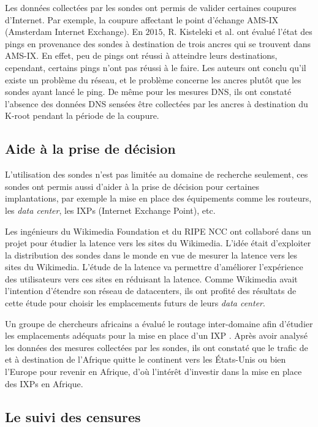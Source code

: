 Les données collectées par les sondes  ont permis de valider certaines coupures d'Internet. Par exemple, la coupure affectant le point d'échange AMS-IX (Amsterdam Internet Exchange). En $2015$, R. Kisteleki  et al. \cite{Robert-Kisteleki}  ont évalué l'état des pings en provenance des sondes  à destination de trois ancres  qui se trouvent dans AMS-IX. En effet, peu de pings ont réussi à atteindre leurs destinations, cependant, certains pings n'ont pas réussi à le faire. 
Les auteurs ont conclu qu'il existe un problème du réseau, et le problème concerne  les ancres plutôt que les sondes ayant lancé le ping. De même pour les mesures DNS, ils ont constaté l'absence des données DNS sensées être collectées par les ancres  à destination du K-root pendant la période de la coupure.



\subsection{Aide à la prise de décision}
L'utilisation des sondes  n'est pas limitée au domaine de recherche seulement,  ces sondes ont permis aussi d'aider à la prise de décision pour certaines implantations, par exemple la mise en place des équipements comme les routeurs, les \textit{data center}, les IXPs (Internet Exchange Point), etc. 

Les ingénieurs du Wikimedia Foundation et du RIPE NCC ont collaboré dans un projet \cite{Wikipedia} pour étudier la  latence vers les sites  du Wikimedia. L'idée était d'exploiter la distribution des sondes   dans le monde en vue  de mesurer la latence vers les sites du Wikimedia. L'étude de la latence va permettre d'améliorer l'expérience des utilisateurs vers ces sites  en réduisant la latence. Comme Wikimedia avait l'intention d'étendre son réseau de datacenters, ils ont profité des résultats de cette étude pour choisir les  emplacements futurs de leurs \textit{data center}.


Un groupe de chercheurs africains a évalué le routage inter-domaine afin d'étudier les emplacements adéquats pour la mise en place d'un IXP \cite{FANOU-Roderick}. Après avoir analysé les données des mesures collectées par les sondes, ils ont constaté que le trafic de et à destination de l'Afrique quitte le continent vers les États-Unis ou bien  l'Europe pour revenir en Afrique, d'où l'intérêt d'investir dans la mise en place des IXPs en Afrique.  \par


\subsection{Le suivi des censures}

